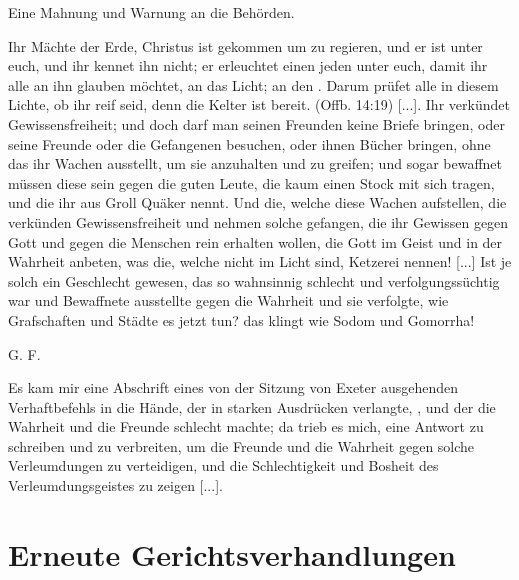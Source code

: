 {
    Eine Mahnung und Warnung an die Behörden.

    \bigskip

    Ihr Mächte der Erde, Christus ist gekommen um zu regieren,
    und er ist unter euch, und ihr kennet ihn nicht; er erleuchtet einen
    jeden unter euch, damit ihr alle an ihn glauben möchtet, an
    das Licht; an den . Darum prüfet
    alle in diesem Lichte, ob ihr reif seid, denn die Kelter ist bereit.
    (Offb. 14:19) [...].
    Ihr verkündet Gewissensfreiheit; 
    und doch darf man seinen
    Freunden keine Briefe bringen, oder seine Freunde oder die
    Gefangenen besuchen, oder ihnen Bücher bringen, ohne das ihr
    Wachen ausstellt, um sie anzuhalten und zu greifen; und sogar
    bewaffnet müssen diese sein gegen die guten Leute, die kaum
    einen Stock mit sich tragen, und die ihr aus Groll Quäker nennt.
    Und die, welche diese Wachen aufstellen, die verkünden 
    Gewissensfreiheit und nehmen solche gefangen, die 
    ihr Gewissen gegen Gott
    und gegen die Menschen rein erhalten wollen, die Gott im Geist
    und in der Wahrheit anbeten, was die, welche nicht im Licht sind,
    Ketzerei nennen! [...] Ist je solch ein Geschlecht gewesen, das
    so wahnsinnig schlecht und verfolgungssüchtig war und Bewaffnete
    ausstellte gegen die Wahrheit und sie verfolgte, wie Grafschaften
    und Städte es jetzt tun? das klingt wie Sodom und Gomorrha!
    \bigskip
    \begin{flushright}G. F.\end{flushright}

}

Es kam mir eine Abschrift eines von der Sitzung von Exeter
ausgehenden Verhaftbefehls in die Hände, der in starken 
Ausdrücken verlangte, , 
und der die Wahrheit und die Freunde schlecht machte; 
da trieb es mich, eine
Antwort zu schreiben und zu verbreiten, um die Freunde und
die Wahrheit gegen solche Verleumdungen 
zu verteidigen, und die Schlechtigkeit und Bosheit 
des Verleumdungsgeistes zu zeigen [...].

\section{Erneute Gerichtsverhandlungen}

